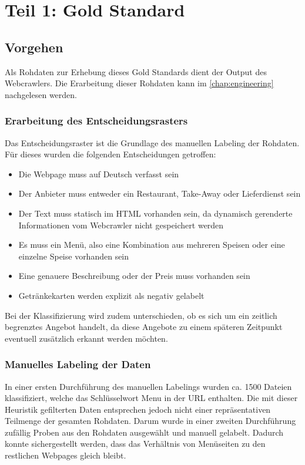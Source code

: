 \chapter{Teil 1: Gold Standard}
\section{Vorgehen}
Als Rohdaten zur Erhebung dieses Gold Standards dient der Output des Webcrawlers.
Die Erarbeitung dieser Rohdaten kann im \cref{chap:engineering} nachgelesen werden.\\
\subsection{Erarbeitung des Entscheidungsrasters}
Das Entscheidungsraster ist die Grundlage des manuellen Labeling der Rohdaten.
Für dieses wurden die folgenden Entscheidungen getroffen:
\begin{itemize}
	\item Die Webpage muss auf Deutsch verfasst sein
	\item Der Anbieter muss entweder ein Restaurant, Take-Away oder Lieferdienst sein
	\item Der Text muss statisch im HTML vorhanden sein, da dynamisch gerenderte Informationen vom Webcrawler nicht gespeichert werden
	\item Es muss ein Menü, also eine Kombination aus mehreren Speisen oder eine einzelne Speise vorhanden sein
	\item Eine genauere Beschreibung oder der Preis muss vorhanden sein
	\item Getränkekarten werden explizit als negativ gelabelt
\end{itemize}
Bei der Klassifizierung wird zudem unterschieden, ob es sich um ein zeitlich begrenztes Angebot handelt, da diese Angebote zu einem späteren Zeitpunkt eventuell zusätzlich erkannt werden möchten.
\subsection{Manuelles Labeling der Daten}
In einer ersten Durchführung des manuellen Labelings wurden ca. 1500 Dateien klassifiziert, welche das Schlüsselwort \glqq Menu\grqq{} in der URL enthalten.
Die mit dieser Heuristik gefilterten Daten entsprechen jedoch nicht einer repräsentativen Teilmenge der gesamten Rohdaten.
Darum wurde in einer zweiten Durchführung zufällig Proben aus den Rohdaten ausgewählt und manuell gelabelt.
Dadurch konnte sichergestellt werden, dass das Verhältnis von Menüseiten zu den restlichen Webpages gleich bleibt.
